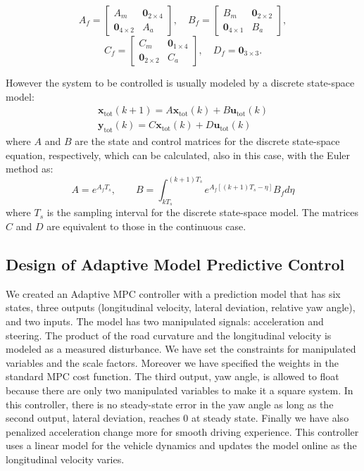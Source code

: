 \documentclass[conference, 11pt]{IEEEtran}
\begin{document}
\[ 
A_f=\begin{bmatrix}
A_m&\textbf{0}_{2\times4}\\
\textbf{0}_{4\times2}&A_a
\end{bmatrix},
\quad
B_f=\begin{bmatrix}
B_m&\textbf{0}_{2\times2}\\
\textbf{0}_{4\times1}&B_a
\end{bmatrix},
\]
\[
C_f=\begin{bmatrix}
C_m&\textbf{0}_{1\times4}\\
\textbf{0}_{2\times2}&C_a
\end{bmatrix}, 
\quad
D_f=\textbf{0}_{3\times3}. 
\]

However the system to be controlled is usually modeled by a discrete state-space model:
\begin{equation*}
\label{eqn:full_dynamics_model_disc}
\begin{array}{rr}
{\textbf{x}}_{\text{tot}}(k+1) =A \textbf{x}_{\text{tot}}(k)+ B \textbf{u}_{\text{tot}}(k)\\
\textbf{y}_{\text{tot}}(k) =C\textbf{x}_{\text{tot}}(k) + D \textbf{u}_{\text{tot}}(k)
\end{array}
\end{equation*}
where $A$ and $B$ are the state and control matrices for the discrete state-space equation, respectively, which can be calculated, also in this case, with the Euler method as:
\[
A = e^{A_fT_s},\qquad B = \int_{kT_s}^{(k+1)T_s} e^{A_f[(k+1)T_s-\eta]}B_f d\eta
\]
where $T_s$ is the sampling interval for the discrete state-space model. The matrices $C$ and $D$ are equivalent to those in the continuous case.

\subsection{Design of Adaptive Model Predictive Control}
We created an Adaptive MPC controller with a prediction model that has six states, three outputs (longitudinal velocity, lateral deviation, relative yaw angle), and two inputs. The model has two manipulated signals: acceleration and steering. The product of the road curvature and the longitudinal velocity is modeled as a measured disturbance. We have set the constraints for manipulated variables and the scale factors. Moreover we have specified the weights in the standard MPC cost function. The third output, yaw angle, is allowed to float because there are only two manipulated variables to make it a square system. In this controller, there is no steady-state error in the yaw angle as long as the second output, lateral deviation, reaches 0 at steady state. Finally we have also penalized acceleration change more for smooth driving experience. This controller uses a linear model for the vehicle dynamics and updates the model online as the longitudinal velocity varies.
\end{document}
